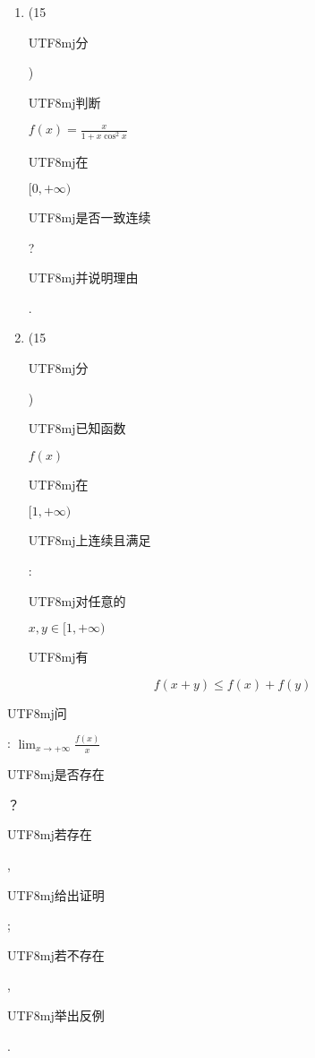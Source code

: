 \documentclass[10pt]{article}
\begin{document}
\begin{enumerate}
  \item (15 \begin{CJK}{UTF8}{mj}分\end{CJK}) \begin{CJK}{UTF8}{mj}判断\end{CJK} $f(x)=\frac{x}{1+x \cos ^{2} x}$ \begin{CJK}{UTF8}{mj}在\end{CJK} $[0,+\infty)$ \begin{CJK}{UTF8}{mj}是否一致连续\end{CJK}? \begin{CJK}{UTF8}{mj}并说明理由\end{CJK}.

  \item (15 \begin{CJK}{UTF8}{mj}分\end{CJK}) \begin{CJK}{UTF8}{mj}已知函数\end{CJK} $f(x)$ \begin{CJK}{UTF8}{mj}在\end{CJK} $[1,+\infty)$ \begin{CJK}{UTF8}{mj}上连续且满足\end{CJK}: \begin{CJK}{UTF8}{mj}对任意的\end{CJK} $x, y \in[1,+\infty)$ \begin{CJK}{UTF8}{mj}有\end{CJK}

\end{enumerate}
$$
f(x+y) \leq f(x)+f(y)
$$
\begin{CJK}{UTF8}{mj}问\end{CJK}: $\lim _{x \rightarrow+\infty} \frac{f(x)}{x}$ \begin{CJK}{UTF8}{mj}是否存在\end{CJK}？\begin{CJK}{UTF8}{mj}若存在\end{CJK}, \begin{CJK}{UTF8}{mj}给出证明\end{CJK}; \begin{CJK}{UTF8}{mj}若不存在\end{CJK}, \begin{CJK}{UTF8}{mj}举出反例\end{CJK}.
\end{document}
